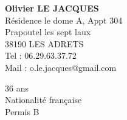 \begin{chapeau}
	\begin{adresse}
		\textbf{Olivier LE JACQUES}\\
		Résidence le dome A, Appt 304\\
		Prapoutel les sept laux\\
		38190 LES ADRETS\\
		Tel : 06.29.63.37.72\\
		Mail : o.le.jacques@gmail.com\\
	\end{adresse}
	\begin{etatcivil}
		36 ans \\
        Nationalité française \\
		Permis B \\
	\end{etatcivil}
\end{chapeau}
